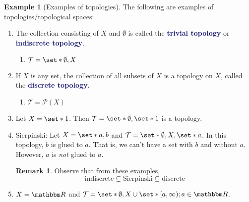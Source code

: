 \documentclass[12pt]{article}
\newcommand{\navy}[1]{\textcolor{MidnightBlue}{\bf #1}}
\theoremstyle{plain}
\theoremstyle{definition}
\newtheorem{definition}{\color{MidnightBlue}{\textbf{Definition}}}[section]
\newtheorem{example}{\color{WildStrawberry}Example}[section]
\newtheorem*{remark}{Remark}
\def\Set{\set*}%
\newcommand{\1}{\mathbbm 1}
\newcommand{\RR}{\mathbbm R}
\newcommand{\pP}{\mathcal P}
\newcommand{\tT}{\mathcal T}
\begin{document}
\begin{example}[Examples of topologies]
The following are examples of topologies/topological spaces:
\begin{enumerate}
	\item The collection consisting of $X$ and $\emptyset$ is called the \navy{trivial topology} or \navy{indiscrete topology}. 
	\begin{enumerate}
		\item $\tT = \Set{\emptyset, X}$
	\end{enumerate}
	\item If $X$ is any set, the collection of all subsets of $X$ is a topology on $X$, called the \navy{discrete topology}.
	\begin{enumerate}
		\item $\tT = \pP(X)$
	\end{enumerate}
	\item Let $X = \Set{1}$. Then $\tT = \Set{\emptyset, \Set{1}}$ is a topology.
	\item Sierpinski: Let $X = \Set{a,b}$ and $\tT = \Set{\emptyset, X, \Set{a}}$. In this topology, $b$ is glued to $a$. That is, we can't have a set with $b$ and without $a$. However, $a$ is \emph{not} glued to $a$. 
	\begin{remark}
	Observe that from these examples,
	\begin{equation*}
		\text{indiscrete} \subsetneq \text{Sierpinski} \subsetneq \text{discrete}
	\end{equation*}
	\end{remark}	
	\item $X = \RR$ and $\tT = \Set{\emptyset, X} \cup \Set{[a,\infty); a \in \RR}$.
\end{enumerate}
\end{example}



\end{document}
